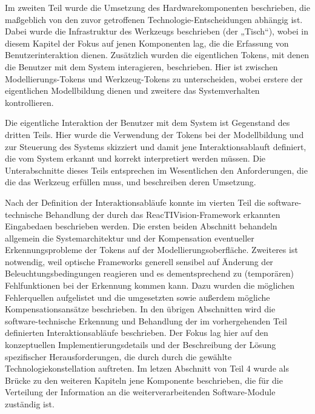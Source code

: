 Im zweiten Teil wurde die Umsetzung des Hardwarekomponenten beschrieben, die maßgeblich von den zuvor getroffenen Technologie-Entscheidungen abhängig ist. Dabei wurde die Infrastruktur des Werkzeugs beschrieben (der „Tisch“), wobei in diesem Kapitel der Fokus auf jenen Komponenten lag, die die Erfassung von Benutzerinteraktion dienen. Zusätzlich wurden die eigentlichen Tokens, mit denen die Benutzer mit dem System interagieren, beschrieben. Hier ist zwischen Modellierungs-Tokens und Werkzeug-Tokens zu unterscheiden, wobei erstere der eigentlichen Modellbildung dienen und zweitere das Systemverhalten kontrollieren.

Die eigentliche Interaktion der Benutzer mit dem System ist Gegenstand des dritten Teils. Hier wurde die Verwendung der Tokens bei der Modellbildung und zur Steuerung des Systems skizziert und damit jene Interaktionsablauft definiert, die vom System erkannt und korrekt interpretiert werden müssen. Die Unterabschnitte dieses Teils entsprechen im Wesentlichen den Anforderungen, die die das Werkzeug erfüllen muss, und beschreiben deren Umsetzung.

Nach der Definition der Interaktionsabläufe konnte im vierten Teil die software-technische Behandlung der durch das ReacTIVision-Framework erkannten Eingabedaen beschrieben werden. Die ersten beiden Abschnitt behandeln allgemein die Systemarchitektur und der Kompensation eventueller Erkennungsprobleme der Tokens auf der Modellierungsoberfläche. Zweiteres ist notwendig, weil optische Frameworks generell sensibel auf Änderung der Beleuchtungsbedingungen reagieren und es dementsprechend zu (temporären) Fehlfunktionen bei der Erkennung kommen kann. Dazu wurden die möglichen Fehlerquellen aufgelistet und die umgesetzten sowie außerdem mögliche Kompensationsansätze beschrieben. In den übrigen Abschnitten wird die software-technische Erkennung und Behandlung der im vorhergehenden Teil definierten Interaktionsabläufe beschrieben. Der Fokus lag hier auf den konzeptuellen Implementierungsdetails und der Beschreibung der Lösung spezifischer Herausforderungen, die durch durch die gewählte Technologiekonstellation auftreten. Im letzen Abschnitt von Teil 4 wurde als Brücke zu den weiteren Kapiteln jene Komponente beschrieben, die für die Verteilung der Information an die weiterverarbeitenden Software-Module zuständig ist.


